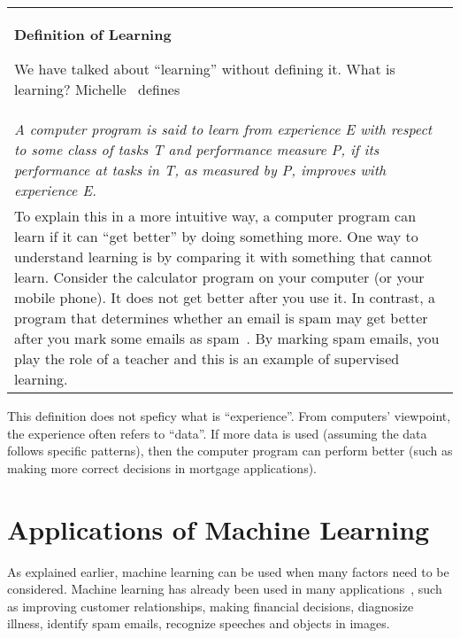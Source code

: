 \begin{comment}
http://incompleteideas.net/book/bookdraft2017nov5.pdf
Reinforcement Learning: An Introduction
Richard S. Sutton and Andrew G. Barto
\end{comment}

\vspace{0.1in}\begin{tabular}{p{5in}}
\index{definition of learning}
  \begin{center}
    {\bf Definition of Learning}
 \end{center}

  We have talked about ``learning'' without defining it.  What is
  learning? Michelle~\cite{Mitchell1997MachineLearning} defines

  \\
  
  {\it
    A computer program is said to learn from experience E with respect
    to some class of tasks T and performance measure P, if its
    performance at tasks in T, as measured by P, improves with
    experience E.}

  \\

  To explain this in a more intuitive way, a computer program can
  learn if it can ``get better'' by doing something more.  One way to
  understand learning is by comparing it with something that cannot
  learn. Consider the calculator program on your computer (or your
  mobile phone). It does not get better after you use it.  In
  contrast, a program that determines whether an email is spam may get
  better after you mark some emails as
  spam~\cite{Hastie2009ElementsStatisticalLearning}.  By marking spam
  emails, you play the role of a teacher and this is an example of
  supervised learning.

\end{tabular}\vspace{0.1in}

This definition does not speficy what is ``experience''.  From
computers' viewpoint, the experience often refers to ``data''.  If
more data is used (assuming the data follows specific patterns), then
the computer program can perform better (such as making more correct
decisions in mortgage applications).

\section{Applications of Machine Learning}

As explained earlier, machine learning can be used when many factors
need to be considered.  Machine learning has already been used in many
applications~\cite{Alpaydin2010IntroductiontoMachine}, such as
improving customer relationships, making financial decisions,
diagnosize illness, identify spam emails, recognize speeches and
objects in images.
